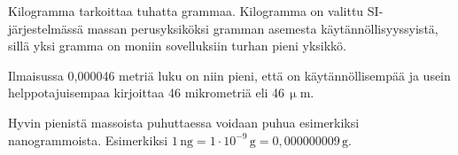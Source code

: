 \begin{esimerkki}
Kilogramma tarkoittaa tuhatta grammaa. Kilogramma on valittu SI-järjestelmässä massan perusyksiköksi gramman asemesta käytännöllisyyssyistä, sillä yksi gramma on moniin sovelluksiin turhan pieni yksikkö.
\end{esimerkki}

\begin{esimerkki}
Ilmaisussa 0,000046 metriä luku on niin pieni, että on käytännöllisempää ja usein helppotajuisempaa kirjoittaa 46 mikrometriä eli 46\,$\upmu$m.
\end{esimerkki}

\begin{esimerkki}
Hyvin pienistä massoista puhuttaessa voidaan puhua esimerkiksi nanogrammoista. Esimerkiksi $1\,\textrm{ng} = 1 \cdot 10^{-9}\,\textrm{g} = 0,000000009\,\textrm{g} $.
\end{esimerkki}







